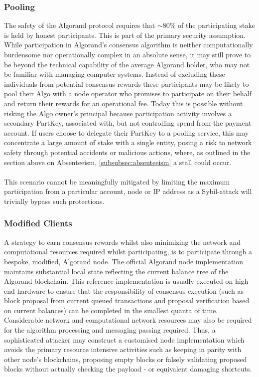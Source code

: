 \documentclass[11pt,a4paper]{article}
\begin{document}
\subsubsection{Pooling}
The safety of the Algorand protocol requires that $\sim$80\% of the participating stake is held by honest participants. 
This is part of the primary security assumption. \\
While participation in Algorand's consensus algorithm is neither computationally burdensome nor operationally complex in 
an absolute sense, it may still prove to be beyond the technical capability of the average Algorand holder, who may not
be familiar with managing computer systems. Instead of excluding these individuals from potential consensus rewards 
these participants may be likely to pool their Algo with a node operator who promises to participate on their behalf and 
return their rewards for an operational fee. Today this is possible without risking the Algo owner’s principal because 
participation activity involves a secondary \gls{PartKey}, associated with, but not controlling spend from the 
payment account. If users choose to delegate their \gls{PartKey} to a pooling service, this may concentrate a large 
amount of stake with a single entity, posing a risk to network safety through potential accidents or malicious actions, 
where, as outlined in the section above on Absenteeism, \ref{subsubsec:absenteeism} a stall could occur. \\ \\
This scenario cannot be meaningfully mitigated by limiting the maximum participation from a particular account, 
node or IP address as a Sybil-attack will trivially bypass such protections.


\subsubsection{Modified Clients}
A strategy to earn consensus rewards whilst also minimizing the network and computational resources required whilst 
participating, is to participate through a bespoke, modified, Algorand node. The official Algorand node implementation 
maintains substantial local state reflecting the current balance tree of the Algorand blockchain. This reference 
implementation is usually executed on high-end hardware to ensure that the responsibility of consensus execution (such 
as block proposal from current queued transactions and proposal verification based on current balances) can be completed 
in the smallest quanta of time. Considerable network and computational network resources may also be required for the 
algorithm processing and messaging passing required. Thus, a sophisticated attacker may construct a customised node 
implementation which avoids the primary resource intensive activities such as keeping in parity with other node's 
blockchains, proposing empty blocks or falsely validating proposed blocks without actually checking the payload - or 
equivalent damaging shortcuts. 
\end{document}
